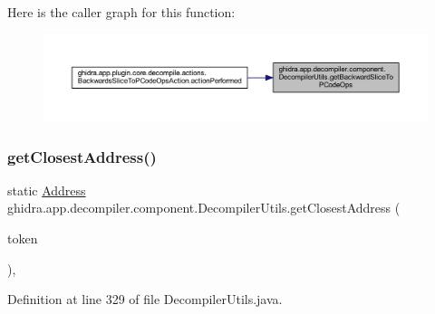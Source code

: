 Here is the caller graph for this function\+:
\nopagebreak
\begin{figure}[H]
\begin{center}
\leavevmode
\includegraphics[width=350pt]{classghidra_1_1app_1_1decompiler_1_1component_1_1_decompiler_utils_a0ab1ddf9b7ca7bf0e66ef9b367c6a17f_icgraph}
\end{center}
\end{figure}
\mbox{\label{classghidra_1_1app_1_1decompiler_1_1component_1_1_decompiler_utils_a84d80e9a65763f50e5b82c91dc8bfde9}} 
\subsubsection{\texorpdfstring{getClosestAddress()}{getClosestAddress()}}
{\footnotesize\ttfamily static \mbox{\hyperlink{class_address}{Address}} ghidra.\+app.\+decompiler.\+component.\+Decompiler\+Utils.\+get\+Closest\+Address (\begin{DoxyParamCaption}\item[{\mbox{\hyperlink{classghidra_1_1app_1_1decompiler_1_1_clang_token}{Clang\+Token}}}]{token }\end{DoxyParamCaption})\hspace{0.3cm}{\ttfamily [inline]}, {\ttfamily [static]}}



Definition at line 329 of file Decompiler\+Utils.\+java.

